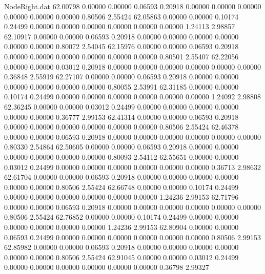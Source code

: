 \begin{filecontents}{NodeRight.dat}
  62.00798    0.00000    0.00000     0.06593    0.20918    0.00000    0.00000    0.00000    0.00000    0.00000    0.00000    0.80506    2.55424
  62.05863    0.00000    0.00000     0.10174    0.24499    0.00000    0.00000    0.00000    0.00000    0.00000    0.00000    1.24113    2.98857
  62.10917    0.00000    0.00000     0.06593    0.20918    0.00000    0.00000    0.00000    0.00000    0.00000    0.00000    0.80072    2.54045
  62.15976    0.00000    0.00000     0.06593    0.20918    0.00000    0.00000    0.00000    0.00000    0.00000    0.00000    0.80501    2.55407
  62.22056    0.00000    0.00000     0.03012    0.20918    0.00000    0.00000    0.00000    0.00000    0.00000    0.00000    0.36848    2.55919
  62.27107    0.00000    0.00000     0.06593    0.20918    0.00000    0.00000    0.00000    0.00000    0.00000    0.00000    0.80055    2.53991
  62.31185    0.00000    0.00000     0.10174    0.24499    0.00000    0.00000    0.00000    0.00000    0.00000    0.00000    1.24092    2.98808
  62.36245    0.00000    0.00000     0.03012    0.24499    0.00000    0.00000    0.00000    0.00000    0.00000    0.00000    0.36777    2.99153
  62.41314    0.00000    0.00000     0.06593    0.20918    0.00000    0.00000    0.00000    0.00000    0.00000    0.00000    0.80506    2.55424
  62.46378    0.00000    0.00000     0.06593    0.20918    0.00000    0.00000    0.00000    0.00000    0.00000    0.00000    0.80330    2.54864
  62.50605    0.00000    0.00000     0.06593    0.20918    0.00000    0.00000    0.00000    0.00000    0.00000    0.00000    0.80093    2.54112
  62.55651    0.00000    0.00000     0.03012    0.24499    0.00000    0.00000    0.00000    0.00000    0.00000    0.00000    0.36713    2.98632
  62.61704    0.00000    0.00000     0.06593    0.20918    0.00000    0.00000    0.00000    0.00000    0.00000    0.00000    0.80506    2.55424
  62.66748    0.00000    0.00000     0.10174    0.24499    0.00000    0.00000    0.00000    0.00000    0.00000    0.00000    1.24236    2.99153
  62.71796    0.00000    0.00000     0.06593    0.20918    0.00000    0.00000    0.00000    0.00000    0.00000    0.00000    0.80506    2.55424
  62.76852    0.00000    0.00000     0.10174    0.24499    0.00000    0.00000    0.00000    0.00000    0.00000    0.00000    1.24236    2.99153
  62.80904    0.00000    0.00000     0.06593    0.24499    0.00000    0.00000    0.00000    0.00000    0.00000    0.00000    0.80506    2.99153
  62.85982    0.00000    0.00000     0.06593    0.20918    0.00000    0.00000    0.00000    0.00000    0.00000    0.00000    0.80506    2.55424
  62.91045    0.00000    0.00000     0.03012    0.24499    0.00000    0.00000    0.00000    0.00000    0.00000    0.00000    0.36798    2.99327

\end{filecontents}
